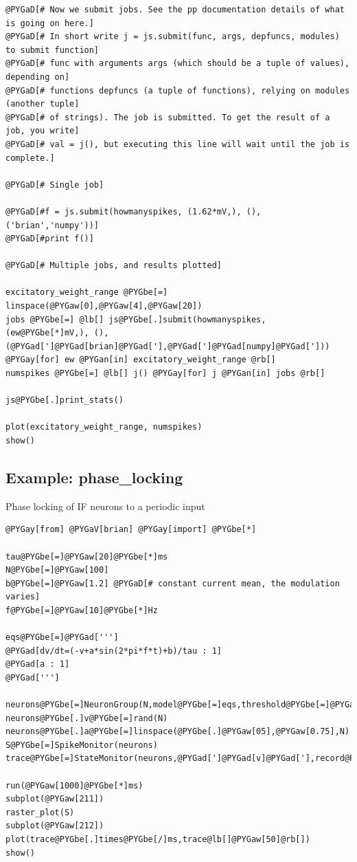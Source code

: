 \documentclass[letterpaper,10pt]{manual}
\begin{document}
\begin{Verbatim}[commandchars=@\[\]]
@PYGaD[# Now we submit jobs. See the pp documentation details of what is going on here.]
@PYGaD[# In short write j = js.submit(func, args, depfuncs, modules) to submit function]
@PYGaD[# func with arguments args (which should be a tuple of values), depending on]
@PYGaD[# functions depfuncs (a tuple of functions), relying on modules (another tuple]
@PYGaD[# of strings). The job is submitted. To get the result of a job, you write]
@PYGaD[# val = j(), but executing this line will wait until the job is complete.]

@PYGaD[# Single job]

@PYGaD[#f = js.submit(howmanyspikes, (1.62*mV,), (), ('brian','numpy'))]
@PYGaD[#print f()]

@PYGaD[# Multiple jobs, and results plotted]

excitatory_weight_range @PYGbe[=] linspace(@PYGaw[0],@PYGaw[4],@PYGaw[20])
jobs @PYGbe[=] @lb[] js@PYGbe[.]submit(howmanyspikes, (ew@PYGbe[*]mV,), (), (@PYGad[']@PYGad[brian]@PYGad['],@PYGad[']@PYGad[numpy]@PYGad['])) @PYGay[for] ew @PYGan[in] excitatory_weight_range @rb[]
numspikes @PYGbe[=] @lb[] j() @PYGay[for] j @PYGan[in] jobs @rb[]

js@PYGbe[.]print_stats()

plot(excitatory_weight_range, numspikes)
show()
\end{Verbatim}

\resetcurrentobjects
{}

\hypertarget{index-43}{}\subsection{Example: phase\_locking}

Phase locking of IF neurons to a periodic input

\begin{Verbatim}[commandchars=@\[\]]
@PYGay[from] @PYGaV[brian] @PYGay[import] @PYGbe[*]

tau@PYGbe[=]@PYGaw[20]@PYGbe[*]ms
N@PYGbe[=]@PYGaw[100]
b@PYGbe[=]@PYGaw[1.2] @PYGaD[# constant current mean, the modulation varies]
f@PYGbe[=]@PYGaw[10]@PYGbe[*]Hz

eqs@PYGbe[=]@PYGad[''']
@PYGad[dv/dt=(-v+a*sin(2*pi*f*t)+b)/tau : 1]
@PYGad[a : 1]
@PYGad[''']

neurons@PYGbe[=]NeuronGroup(N,model@PYGbe[=]eqs,threshold@PYGbe[=]@PYGaw[1],reset@PYGbe[=]@PYGaw[0])
neurons@PYGbe[.]v@PYGbe[=]rand(N)
neurons@PYGbe[.]a@PYGbe[=]linspace(@PYGbe[.]@PYGaw[05],@PYGaw[0.75],N)
S@PYGbe[=]SpikeMonitor(neurons)
trace@PYGbe[=]StateMonitor(neurons,@PYGad[']@PYGad[v]@PYGad['],record@PYGbe[=]@PYGaw[50])

run(@PYGaw[1000]@PYGbe[*]ms)
subplot(@PYGaw[211])
raster_plot(S)
subplot(@PYGaw[212])
plot(trace@PYGbe[.]times@PYGbe[/]ms,trace@lb[]@PYGaw[50]@rb[])
show()
\end{Verbatim}
\end{document}
